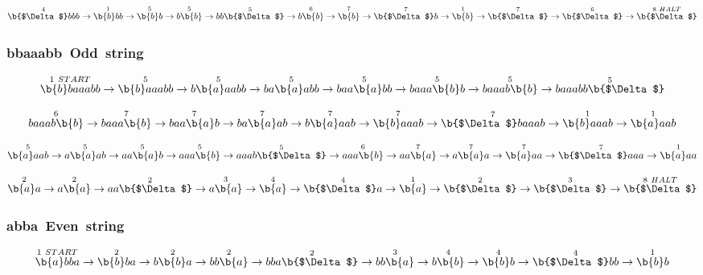 \documentclass[12pt]{article}
\begin{document}
\[
\overset{4}{\b{$\Delta$}bbb}\rightarrow
\overset{1}{\b{b}bb}\rightarrow
\overset{5}{\b{b}b}\rightarrow
 \overset{5}{b\b{b}}\rightarrow
\overset{5}{bb\b{$\Delta$}}\rightarrow
\overset{6}{b\b{b}}\rightarrow
\overset{7}{\b{b}}\rightarrow
\overset{7}{\b{$\Delta$}b}\rightarrow
\overset{1}{\b{b}}\rightarrow
\overset{7}{\b{$\Delta$}}\rightarrow
\overset{6}{\b{$\Delta$}}\rightarrow
\overset{8~HALT}{\b{$\Delta$}}
\]
\subsubsection{bbaaabb~Odd~string}
\[
\overset{1~START}{\b{b}baaabb}\rightarrow
\overset{5}{\b{b}aaabb}\rightarrow
\overset{5}{b\b{a}aabb}\rightarrow
\overset{5}{ba\b{a}abb}\rightarrow
\overset{5}{baa\b{a}bb}\rightarrow
\overset{5}{baaa\b{b}b}\rightarrow
\overset{5}{baaab\b{b}}\rightarrow
\overset{5}{baaabb\b{$\Delta$} }\]

\[
\overset{6}{baaab\b{b}}\rightarrow
\overset{7}{baaa\b{b}}\rightarrow
\overset{7}{baa\b{a}b}\rightarrow
\overset{7}{ba\b{a}ab}\rightarrow
\overset{7}{b\b{a}aab}\rightarrow
\overset{7}{\b{b}aaab}\rightarrow
\overset{7}{\b{$\Delta$}baaab}\rightarrow
\overset{1}{\b{b}aaab}\rightarrow
\overset{1}{\b{a}aab}
\]

\[
\overset{5}{\b{a}aab}\rightarrow
\overset{5}{a\b{a}ab}\rightarrow
\overset{5}{aa\b{a}b}\rightarrow
\overset{5}{aaa\b{b}}\rightarrow
\overset{5}{aaab\b{$\Delta$}}\rightarrow
\overset{6}{aaa\b{b}}\rightarrow
\overset{7}{aa\b{a}}\rightarrow
\overset{7}{a\b{a}a}\rightarrow
\overset{7}{\b{a}aa}\rightarrow
\overset{7}{\b{$\Delta$}aaa}\rightarrow
\overset{1}{\b{a}aa}
\]

\[
\overset{2}{\b{a}a}\rightarrow
\overset{2}{a\b{a}}\rightarrow
\overset{2}{aa\b{$\Delta$}}\rightarrow
\overset{3}{a\b{a}}\rightarrow
\overset{4}{\b{a}}\rightarrow
\overset{4}{\b{$\Delta$}a}\rightarrow
\overset{1}{\b{a}}\rightarrow
\overset{2}{\b{$\Delta$}}\rightarrow
\overset{3}{\b{$\Delta$}}\rightarrow
\overset{8~HALT}{\b{$\Delta$}}
\]

\subsubsection{abba~Even~string}

\[
\overset{1~START}{\b{a}bba}\rightarrow
\overset{2}{\b{b}ba}\rightarrow
\overset{2}{b\b{b}a}\rightarrow
\overset{2}{bb\b{a}}\rightarrow
\overset{2}{bba\b{$\Delta$}}\rightarrow
\overset{3}{bb\b{a}}\rightarrow
\overset{4}{b\b{b}}\rightarrow
\overset{4}{\b{b}b}\rightarrow
\overset{4}{\b{$\Delta$}bb}\rightarrow
\overset{1}{\b{b}b}
\]
\end{document}
